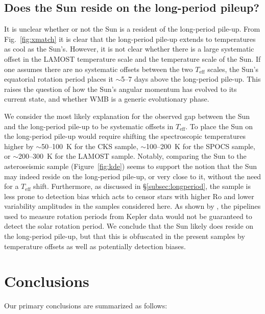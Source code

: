 \documentclass[trackchanges,twocolumn]{aastex631}
\newcommand{\teff}{\ensuremath{T_{\mathrm{eff}}}\xspace}
\begin{document}
\subsection{Does the Sun reside on the long-period pileup?} \label{subsec:thesun}

It is unclear whether or not the Sun is a resident of the long-period pile-up. From Fig.~\ref{fig:xmatch} it is clear that the long-period pile-up extends to temperatures as cool as the Sun's. However, it is not clear whether there is a large systematic offset in the LAMOST temperature scale and the temperature scale of the Sun. If one assumes there are no systematic offsets between the two \teff scales, the Sun's equatorial rotation period places it $\sim$5--7 days above the long-period pile-up. This raises the question of how the Sun's angular momentum has evolved to its current state, and whether WMB is a generic evolutionary phase. 

We consider the most likely explanation for the observed gap between the Sun and the long-period pile-up to be systematic offsets in \teff. To place the Sun on the long-period pile-up would require shifting the spectroscopic temperatures higher by $\sim$50--100~K for the CKS sample, $\sim$100--200~K for the SPOCS sample, or $\sim$200--300~K for the LAMOST sample. Notably, comparing the Sun to the \citet{Hall2021} asteroseismic sample (Figure~\ref{fig:kde}) seems to support the notion that the Sun may indeed reside on the long-period pile-up, or very close to it, without the need for a \teff shift. Furthermore, as discussed in \S\ref{subsec:longperiod}, the \citet{Hall2021} sample is less prone to detection bias which acts to censor stars with higher Ro and lower variability amplitudes in the samples considered here. As shown by \citet{Aigrain2015}, the pipelines used to measure rotation periods from Kepler data would not be guaranteed to detect the solar rotation period. We conclude that the Sun likely does reside on the long-period pile-up, but that this is obfuscated in the present samples by temperature offsets as well as potentially detection biases.

\section{Conclusions} \label{sec:conclusions}

Our primary conclusions are summarized as follows:
\end{document}
